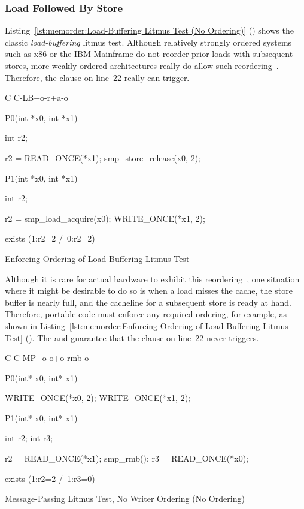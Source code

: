 \subsubsection{Load Followed By Store}
\label{sec:memorder:Load Followed By Store}

Listing~\ref{lst:memorder:Load-Buffering Litmus Test (No Ordering)}
()
shows the classic \emph{load-buffering} litmus test.
Although relatively strongly ordered systems such as x86
or the IBM Mainframe do not reorder prior loads with subsequent stores,
more weakly ordered architectures really do allow such
reordering~\cite{JadeAlglave2011ppcmem}.
Therefore, the  clause on line~22 really can trigger.

\begin{listing}[tbp]
{ \scriptsize
\begin{verbbox}[\LstLineNo]
C C-LB+o-r+a-o
{
}

P0(int *x0, int *x1)
{
  int r2;

  r2 = READ_ONCE(*x1);
  smp_store_release(x0, 2);
}


P1(int *x0, int *x1)
{
  int r2;

  r2 = smp_load_acquire(x0);
  WRITE_ONCE(*x1, 2);
}

exists (1:r2=2 /\ 0:r2=2)
\end{verbbox}
}
\centering
\theverbbox
\caption{Enforcing Ordering of Load-Buffering Litmus Test}
\label{lst:memorder:Enforcing Ordering of Load-Buffering Litmus Test}
\end{listing}

Although it is rare for actual hardware to
exhibit this reordering~\cite{LucMaranget2017aarch64},
one situation where it might be desirable to do so is when a load
misses the cache, the store buffer is nearly full, and the cacheline for
a subsequent store is ready at hand.
Therefore, portable code must enforce any required ordering, for example,
as shown in
Listing~\ref{lst:memorder:Enforcing Ordering of Load-Buffering Litmus Test}
().
The  and  guarantee that
the  clause on line~22 never triggers.

\begin{listing}[tbp]
{ \scriptsize
\begin{verbbox}[\LstLineNo]
C C-MP+o-o+o-rmb-o

{
}

P0(int* x0, int* x1) {

  WRITE_ONCE(*x0, 2);
  WRITE_ONCE(*x1, 2);

}

P1(int* x0, int* x1) {

  int r2;
  int r3;

  r2 = READ_ONCE(*x1);
  smp_rmb();
  r3 = READ_ONCE(*x0);

}

exists (1:r2=2 /\ 1:r3=0)
\end{verbbox}
}
\centering
\theverbbox
\caption{Message-Passing Litmus Test, No Writer Ordering (No Ordering)}
\label{lst:memorder:Message-Passing Litmus Test, No Writer Ordering (No Ordering)}
\end{listing}


